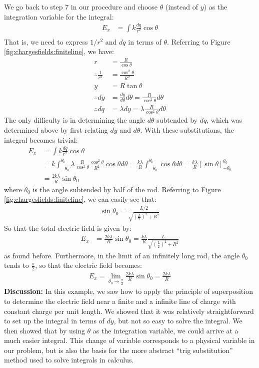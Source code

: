 \begin{example}
We go back to step 7 in our procedure and choose $\theta$ (instead of $y$) as the integration variable for the integral:
\begin{align*}
E_x &=\int k\frac{dq}{r^2}\cos\theta\\
\end{align*}
That is, we need to express $1/r^2$ and $dq$ in terms of $\theta$. Referring to Figure \ref{fig:chargesfields:finiteline}, we have:
\begin{align*}
r &= \frac{R}{\cos\theta}\\
\therefore \frac{1}{r^2}&=\frac{\cos^2\theta}{R^2}\\
y &= R\tan\theta\\
\therefore dy &= \frac{dy}{d\theta}d\theta=\frac{R}{\cos^2\theta}d\theta\\
\therefore dq &= \lambda dy =\lambda\frac{R}{\cos^2\theta}d\theta
\end{align*}
The only difficulty is in determining the angle $d\theta$ subtended by $dq$, which was determined above by first relating $dy$ and $d\theta$. With these substitutions, the integral becomes trivial:
\begin{align*}
E_x &=\int k\frac{dq}{r^2}\cos\theta\\
&=k\int_{-\theta_0}^{\theta_0} \lambda\frac{R}{\cos^2\theta} \frac{\cos^2\theta}{R^2} \cos\theta d\theta=\frac{k\lambda}{R}\int_{-\theta_0}^{\theta_0}\cos\theta d\theta=\frac{k\lambda}{R}\left[\sin\theta \right]_{-\theta_0}^{\theta_0}\\
&=\frac{2k\lambda}{R}\sin\theta_0
\end{align*}
where $\theta_0$ is the angle subtended by half of the rod. Referring to Figure \ref{fig:chargesfields:finiteline}, we can easily see that:
\begin{align*}
\sin\theta_0=\frac{L/2}{\sqrt{\left(\frac{L}{2}\right)^2+R^2}}
\end{align*}
So that the total electric field is given by:
\begin{align*}
E_x &=\frac{2k\lambda}{R}\sin\theta_0=\frac{k\lambda}{R}\frac{L}{\sqrt{\left(\frac{L}{2}\right)^2+R^2}}
\end{align*}
as found before. Furthermore, in the limit of an infinitely long rod, the angle $\theta_0$ tends to $\frac{\pi}{2}$, so that the electric field becomes:
\begin{align*}
E_x=\lim_{\theta_0\to\frac{\pi}{2}}\frac{2k\lambda}{R}\sin\theta_0=\frac{2k\lambda}{R}
\end{align*}
\textbf{Discussion:} In this example, we saw how to apply the principle of superposition to determine the electric field near a finite and a infinite line of charge with constant charge per unit length. We showed that it was relatively straightforward to set up the integral in terms of $dy$, but not so easy to solve the integral. We then showed that by using $\theta$ as the integration variable, we could arrive at a much easier integral. This change of variable corresponds to a physical variable in our problem, but is also the basis for the more abstract ``trig substitution'' method used to solve integrals in calculus.
\end{example}
